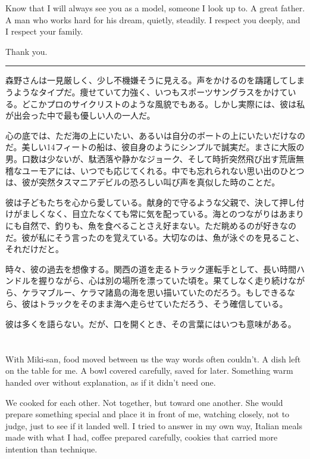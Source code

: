 \documentclass[
  letterpaper,
  oneside]{scrbook}
\begin{document}
Know that I will always see you as a model, someone I look up to. A
great father. A man who works hard for his dream, quietly, steadily. I
respect you deeply, and I respect your family.

Thank you.

\begin{center}\rule{0.5\linewidth}{0.5pt}\end{center}

森野さんは一見厳しく、少し不機嫌そうに見える。声をかけるのを躊躇してしまうようなタイプだ。痩せていて力強く、いつもスポーツサングラスをかけている。どこかプロのサイクリストのような風貌でもある。しかし実際には、彼は私が出会った中で最も優しい人の一人だ。

心の底では、ただ海の上にいたい、あるいは自分のボートの上にいたいだけなのだ。美しい14フィートの船は、彼自身のようにシンプルで誠実だ。まさに大阪の男。口数は少ないが、駄洒落や静かなジョーク、そして時折突然飛び出す荒唐無稽なユーモアには、いつでも応じてくれる。中でも忘れられない思い出のひとつは、彼が突然タスマニアデビルの恐ろしい叫び声を真似した時のことだ。

彼は子どもたちを心から愛している。献身的で守るような父親で、決して押し付けがましくなく、目立たなくても常に気を配っている。海とのつながりはあまりにも自然で、釣りも、魚を食べることさえ好まない。ただ眺めるのが好きなのだ。彼が私にそう言ったのを覚えている。大切なのは、魚が泳ぐのを見ること、それだけだと。

時々、彼の過去を想像する。関西の道を走るトラック運転手として、長い時間ハンドルを握りながら、心は別の場所を漂っていた頃を。果てしなく走り続けながら、ケラマブルー、ケラマ諸島の海を思い描いていたのだろう。もしできるなら、彼はトラックをそのまま海へ走らせていただろう、そう確信している。

彼は多くを語らない。だが、口を開くとき、その言葉にはいつも意味がある。


\chapter{}\label{section-1}

With Miki-san, food moved between us the way words often couldn't. A
dish left on the table for me. A bowl covered carefully, saved for
later. Something warm handed over without explanation, as if it didn't
need one.

We cooked for each other. Not together, but toward one another. She
would prepare something special and place it in front of me, watching
closely, not to judge, just to see if it landed well. I tried to answer
in my own way, Italian meals made with what I had, coffee prepared
carefully, cookies that carried more intention than technique.
\end{document}
